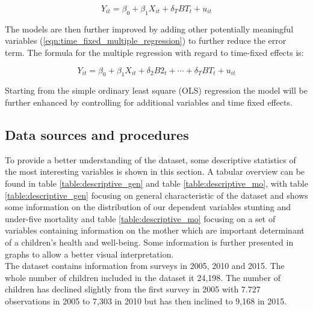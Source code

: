 \documentclass[a4paper, 11pt]{article} %
\begin{document}
\begin{equation}
Y_{it} = \beta_0 + \beta_1 X_{it} + \delta_T BT_t + u_{it}
 \label{eqn:time_fixed_regression}
\end{equation}

The models are then further improved by adding other potentially meaningful variables (\ref{eqn:time_fixed_multiple_regression}) to further reduce the error term. The formula for the multiple regression with regard to time-fixed effects is:

\begin{equation}
Y_{it} = \beta_0 + \beta_1 X_{it} + \delta_2 B2_t + \cdots + \delta_T BT_t + u_{it}
 \label{eqn:time_fixed_multiple_regression}
\end{equation}

Starting from the simple ordinary least square (OLS) regression the model will be further enhanced by controlling for additional variables and time fixed effects. 

\subsection*{Data sources and procedures}
To provide a better understanding of the dataset, some descriptive statistics of the most interesting variables is shown in this section. A tabular overview can be found in
 table \ref{table:descriptive_gen} and table \ref{table:descriptive_mo}, with table \ref{table:descriptive_gen} focusing on general characteristic of the dataset and shows some information on the distribution of our dependent variables stunting and under-five mortality and table \ref{table:descriptive_mo} focusing on a set of variables containing information on the mother which are important determinant of a children's health and well-being. Some information is further presented in graphs to allow a better visual interpretation. \\
 
 The dataset contains information from surveys in 2005, 2010 and 2015. The whole number of children included in the dataset it 24,198. The number of children has declined slightly from the first survey in 2005 with 7.727 observations in 2005 to 7,303 in 2010 but has then inclined to 9,168 in 2015. \\
\end{document}
